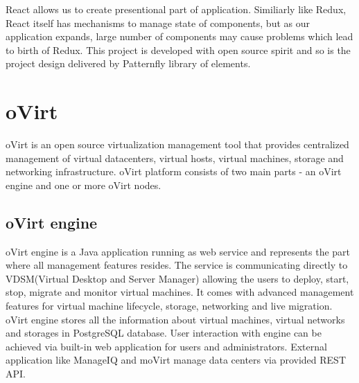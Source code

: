 React allows us to create presentional part of application. Similiarly like Redux, React itself has mechanisms to manage state of components, but as our application expands, large number of components may cause problems which lead to birth of Redux. This project is developed with open source spirit and so is the project design delivered by Patternfly\cite{Patternfly} library of elements.

\chapter{oVirt}
oVirt is an open source virtualization management tool that provides centralized management of virtual datacenters, virtual hosts, virtual machines, storage and networking infrastructure. oVirt platform consists of two main parts - an oVirt engine and one or more oVirt nodes.


\section{oVirt engine}
oVirt engine is a Java application running as web service and represents the part where all management features resides. The service is communicating directly to VDSM(Virtual Desktop and Server Manager) allowing the users to deploy, start, stop, migrate and monitor virtual machines. It comes with advanced management features for virtual machine lifecycle, storage, networking and live migration. oVirt engine stores all the information about virtual machines, virtual networks and storages in PostgreSQL\cite{postgre} database. User interaction with engine can be achieved via built-in web application for users and administrators. External application like ManageIQ and moVirt manage data centers via provided REST API.

